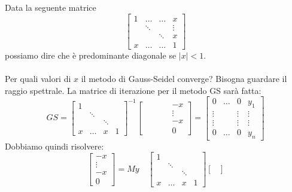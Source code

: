 \begin{example}
	Data la seguente matrice
	\begin{equation*}
		\begin{bmatrix}
			1 & \ldots & \ldots&x\\
			& \ddots & & \vdots \\
			& & \ddots & x\\
			x & \ldots& \ldots& 1
		\end{bmatrix}
	\end{equation*}
	possiamo dire che è predominante diagonale se $\lvert x \rvert < 1$.\\\\
	Per quali valori di $x$ il metodo di Gauss-Seidel converge? Bisogna guardare il raggio spettrale. La matrice di iterazione per il metodo GS sarà fatta:
	\begin{equation*}
		GS=\begin{bmatrix}
			1 & \\
			& \ddots \\
			& & \ddots \\
			x & \ldots & x & 1
		\end{bmatrix}^{-1}\begin{bmatrix}
		& & & & -x \\
		& & & & \vdots \\
		& & &&  -x \\
		& & && 0
		\end{bmatrix} = \begin{bmatrix}
		0 & \ldots & 0 & y_1 \\
		\vdots & & \vdots & \vdots \\
		\vdots & & \vdots & \vdots \\
		0 & \ldots & 0 & y_n
		\end{bmatrix}
	\end{equation*}
	Dobbiamo quindi risolvere:
	\begin{equation*}
		\begin{bmatrix}
			-x \\ \vdots \\ -x \\0
		\end{bmatrix}=My \quad
		\begin{bmatrix}
			1 & \\
			& \ddots \\
			& & \ddots \\
			x & \ldots & x & 1
		\end{bmatrix}\begin{bmatrix}

\end{bmatrix}
\end{equation*}
\end{example}
